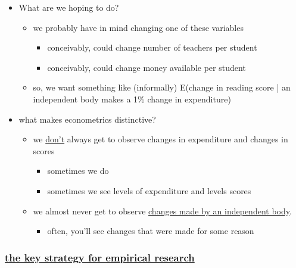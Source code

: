 \documentclass[11pt]{article}
\begin{document}
\begin{itemize}
\item What are we hoping to do?
\begin{itemize}
\item we probably have in mind changing one of these variables
\begin{itemize}
\item conceivably, could change number of teachers per student
\item conceivably, could change money available per student
\end{itemize}
\item so, we want something like (informally) E(change in reading
          score | an independent body makes a 1\% change in expenditure)
\end{itemize}
\item what makes econometrics distinctive?
\begin{itemize}
\item we \underline{don't} always get to observe changes in expenditure and
          changes in scores
\begin{itemize}
\item sometimes we do
\item sometimes we see levels of expenditure and levels scores
\end{itemize}
\item we almost never get to observe \underline{changes made by an independent           body}.
\begin{itemize}
\item often, you'll see changes that were made for some reason
\end{itemize}
\end{itemize}
\end{itemize}
\subsubsection{\underline{the key strategy for empirical research}}
\label{sec-1-1-2}
\end{document}
